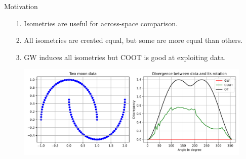 \documentclass{beamer}
\begin{document}
\begin{frame}{Motivation}
\scriptsize

\begin{enumerate}
  \item[1.] Isometries are useful for across-space comparison.
  \item[2.] All isometries are created equal, but some are more equal than others.
  \item[3.] GW induces all isometries but COOT is good at exploiting data.
\end{enumerate}
\begin{figure}
    \centering
    \includegraphics[width=1.\linewidth, keepaspectratio=true]{OT_new/div_vs_angle.pdf}
\end{figure}

\end{frame}
\end{document}
